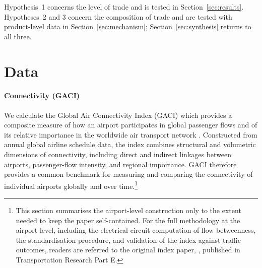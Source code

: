 Hypothesis~1 concerns the level of trade and is tested in
Section~\ref{sec:results}. Hypotheses~2 and 3 concern the composition of
trade and are tested with product-level data in
Section~\ref{sec:mechanism}; Section~\ref{sec:synthesis} returns to all
three.

\section{Data}
\label{sec:data}

\paragraph{Connectivity (GACI)}
We calculate the Global Air Connectivity Index (GACI) which provides a composite measure of how an airport participates in global passenger flows and of its relative importance in the worldwide air transport network \citep{Cheung_2020}. Constructed from annual global airline schedule data, the index combines structural and volumetric dimensions of connectivity, including direct and indirect linkages between airports, passenger-flow intensity, and regional importance. GACI therefore provides a common benchmark for measuring and comparing the connectivity of individual airports globally and over time.\footnote{This section summarises the airport-level construction only to the extent needed to keep the paper self-contained. For the full methodology at the airport level, including the electrical-circuit computation of flow betweenness, the standardisation procedure, and validation of the index against traffic outcomes, readers are referred to the original index paper, \citet{Cheung_2020}, published in Transportation Research Part E.}

